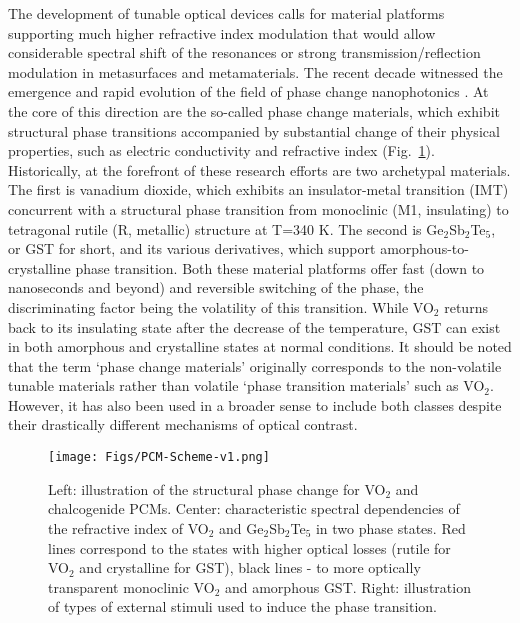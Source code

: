 \documentclass[journal=chreay,manuscript=review]{achemso}
\begin{document}
The development of tunable optical devices calls for material platforms supporting much higher refractive index modulation that would allow considerable spectral shift of the resonances or strong transmission/reflection modulation in metasurfaces and metamaterials. The recent decade witnessed the emergence and rapid evolution of the field of phase change nanophotonics \cite{wuttig2017phase,hail2019optical,abdollahramezani2021dynamic}. At the core of this direction are the so-called phase change materials, which exhibit structural phase transitions accompanied by substantial change of their physical properties, such as electric conductivity and refractive index (Fig.~\ref{fig:PCM-scheme}). Historically, at the forefront of these research efforts are two archetypal materials. The first is vanadium dioxide, which exhibits an insulator-metal transition (IMT) concurrent with a structural phase transition from monoclinic (M1, insulating) to tetragonal rutile (R, metallic) structure at T=340 K. The second is Ge$_2$Sb$_2$Te$_5$, or GST for short, and its various derivatives, which support amorphous-to-crystalline phase transition\cite{wuttig2017phase}. Both these material platforms offer fast (down to nanoseconds and beyond) and reversible switching of the phase, the discriminating factor being the volatility of this transition. While VO$_2$ returns back to its insulating state after the decrease of the temperature, GST can exist in both amorphous and crystalline states at normal conditions. It should be noted that the term ‘phase change materials’ originally corresponds to the non-volatile tunable materials rather than volatile ‘phase transition materials’ such as VO$_2$\cite{wuttig2017phase}. However, it has also been used in a broader sense to include both classes despite their drastically different mechanisms of optical contrast.

\begin{figure}[t]
    \centering
    \texttt{[image: Figs/PCM-Scheme-v1.png]}
    \caption{
    Left: illustration of the structural phase change for VO$_2$ and chalcogenide PCMs. Center: characteristic spectral dependencies of the refractive index of VO$_2$ and Ge$_2$Sb$_2$Te$_5$ in two phase states. Red lines correspond to the states with higher optical losses (rutile for VO$_2$ and crystalline for GST), black lines - to more optically transparent monoclinic VO$_2$ and amorphous GST. Right: illustration of types of external stimuli used to induce the phase transition.}
    \label{fig:PCM-scheme}
\end{figure}
\end{document}
